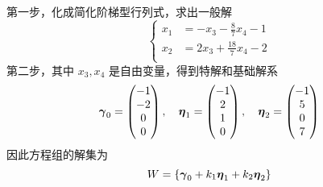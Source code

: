 第一步，化成简化阶梯型行列式，求出一般解
\[ \left\{
	\begin{aligned}
		x_1 & = -x_3 - \frac{8}{7}x_4 - 1  \\
		x_2 & = 2x_3 + \frac{18}{7}x_4 - 2 \\
	\end{aligned} \right. \]
第二步，其中 $x_3, x_4$ 是自由变量，得到特解和基础解系
\[ \boldsymbol{\gamma}_0 = \left(\begin{matrix}
			-1 \\ -2 \\ 0 \\ 0
		\end{matrix}\right), \quad \boldsymbol{\eta}_1 = \left(\begin{matrix}
			-1 \\ 2 \\ 1 \\ 0
		\end{matrix}\right), \quad \boldsymbol{\eta}_2 = \left(\begin{matrix}
			-1 \\ 5 \\ 0 \\ 7
		\end{matrix}\right) \]
因此方程组的解集为
\[ W = \{ \boldsymbol{\gamma}_0 + k_1 \boldsymbol{\eta}_1 + k_2 \boldsymbol{\eta}_2 \} \]

